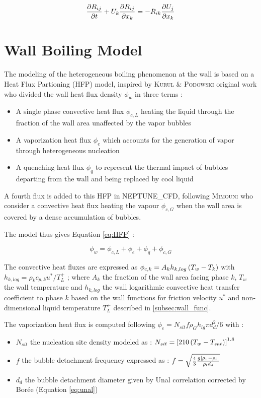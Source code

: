\begin{equation}
\frac{\partial{R_{ij}}}{\partial t} + U_{k}\frac{\partial R_{ij}}{\partial x_{k}} = - R_{ik} \frac{\partial U_{j}}{\partial x_{k}}
\end{equation}


\section{Wall Boiling Model}
\label{subsec:HFP}

The modeling of the heterogeneous boiling phenomenon at the wall is based on a Heat Flux Partioning (HFP) model, inspired by \textsc{Kurul} \& \textsc{Podowski} original work\cite{kurul1990} who divided the wall heat flux density $\phi_{w}$ in three terms  :

\begin{itemize}
\item A single phase convective heat flux $\phi_{c,L}$ heating the liquid through the fraction of the wall area unaffected by the vapor bubbles
\item A vaporization heat flux $\phi_{e}$ which accounts for the generation of vapor through heterogeneous nucleation
\item A quenching heat flux $\phi_{q}$ to represent the thermal impact of bubbles departing from the wall and being replaced by cool liquid
\end{itemize}

A fourth flux is added to this HFP in NEPTUNE\_CFD, following \textsc{Mimouni} \etal\cite{mimouni2016} who consider a convective heat flux heating the vapour $\phi_{c,G}$ when the wall area is covered by a dense accumulation of bubbles.

The model thus gives Equation \ref{eq:HFP} :

\begin{equation}
\label{eq:HFP}
\phi_{w}=\phi_{c,L}+\phi_{e}+\phi_{q}+\phi_{c,G}
\end{equation}

The convective heat fluxes are expressed as $\phi_{c,k}=A_{k}h_{k,log}\left( T_{w}-T_{k} \right)$ with $ h_{k,log}=\rho_{k}c_{p,k}{u^{*}}/{T_{L}^{+}}$ ; where $A_{k}$ the fraction of the wall area facing phase $k$, $T_{w}$ the wall temperature and $h_{k,log}$ the wall logarithmic convective heat transfer coefficient to phase $k$ based on the wall functions for friction velocity $u^{*}$ and non-dimensional liquid temperature $T_{L}^{+}$ described in \ref{subsec:wall_func}.

The vaporization heat flux is computed following $\phi_{e}=N_{sit}f\rho_{G}h_{lg}{\pi d_{d}^{2}}/{6}$ with :
\begin{itemize}
\item $N_{sit}$ the nucleation site density modeled as \cite{lemmert1977} : $N_{sit}=\left[ 210\left( T_{w}-T_{sat} \right)  \right]^{1.8}$
\item $f$ the bubble detachment frequency expressed as \cite{cole1960} : $f=\sqrt{\frac{4}{3}\frac{g\left| \rho_{v}-\rho_{l} \right| }{\rho_{l}d_{d}}}$
\item $d_{d}$ the bubble detachment diameter given by Unal correlation\cite{unal1976} corrected by Bor\'ee \etal[ref] (Equation \ref{eq:unal})
\end{itemize}

